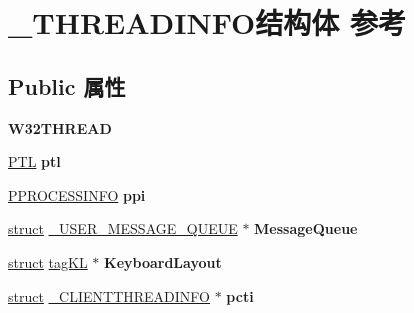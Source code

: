 \hypertarget{struct___t_h_r_e_a_d_i_n_f_o}{}\section{\+\_\+\+T\+H\+R\+E\+A\+D\+I\+N\+F\+O结构体 参考}
\label{struct___t_h_r_e_a_d_i_n_f_o}
\subsection*{Public 属性}
\begin{DoxyCompactItemize}
\item 
\mbox{\label{struct___t_h_r_e_a_d_i_n_f_o_a969360470995858ddab97bd0a2072f2c}} 
{\bfseries W32\+T\+H\+R\+E\+AD}
\item 
\mbox{\label{struct___t_h_r_e_a_d_i_n_f_o_ac1b1574ca4b2c36a29eebf355862de1e}} 
\hyperlink{struct___t_l}{P\+TL} {\bfseries ptl}
\item 
\mbox{\label{struct___t_h_r_e_a_d_i_n_f_o_a08e87c71a1ed2aa097aa941f11b48762}} 
\hyperlink{struct___p_r_o_c_e_s_s_i_n_f_o}{P\+P\+R\+O\+C\+E\+S\+S\+I\+N\+FO} {\bfseries ppi}
\item 
\mbox{\label{struct___t_h_r_e_a_d_i_n_f_o_aef416412637367e8be54c4cac7d7f540}} 
\hyperlink{interfacestruct}{struct} \hyperlink{struct___u_s_e_r___m_e_s_s_a_g_e___q_u_e_u_e}{\+\_\+\+U\+S\+E\+R\+\_\+\+M\+E\+S\+S\+A\+G\+E\+\_\+\+Q\+U\+E\+UE} $\ast$ {\bfseries Message\+Queue}
\item 
\mbox{\label{struct___t_h_r_e_a_d_i_n_f_o_a8d37e7be50a03dc6d33abe2ce269ecf7}} 
\hyperlink{interfacestruct}{struct} \hyperlink{structtag_k_l}{tag\+KL} $\ast$ {\bfseries Keyboard\+Layout}
\item 
\mbox{\label{struct___t_h_r_e_a_d_i_n_f_o_a9fcfa87863ee67e6a99e47a74cf8170f}} 
\hyperlink{interfacestruct}{struct} \hyperlink{struct___c_l_i_e_n_t_t_h_r_e_a_d_i_n_f_o}{\+\_\+\+C\+L\+I\+E\+N\+T\+T\+H\+R\+E\+A\+D\+I\+N\+FO} $\ast$ {\bfseries pcti}
\item 
\mbox{\label{struct___t_h_r_e_a_d_i_n_f_o_acf8752c0a959b8838ff7ae0a6a9d74e4}} 

\end{DoxyCompactItemize}
